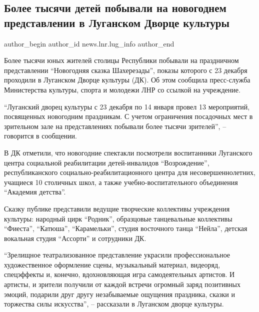  
 
 
 
 
\subsection{Более тысячи детей побывали на новогоднем представлении в Луганском Дворце культуры}
\label{sec:14_01_2022.stz.news.lnr.lug_info.1.deti_novgod_dvorec_kultury}

\ifcmt
 author_begin
   author_id news.lnr.lug_info
 author_end
\fi

Более тысячи юных жителей столицы Республики побывали на праздничном
представлении \enquote{Новогодняя сказка Шахерезады}, показы которого с 23 декабря
проходили в Луганском Дворце культуры (ДК). Об этом сообщила пресс-служба
Министерства культуры, спорта и молодежи ЛНР со ссылкой на учреждение.


\enquote{Луганский дворец культуры с 23 декабря по 14 января провел 13 мероприятий,
посвященных новогодним праздникам. С учетом ограничения посадочных мест в
зрительном зале на представлениях побывали более тысячи зрителей}, – говорится
в сообщении.


В ДК отметили, что новогодние спектакли посмотрели воспитанники Луганского
центра социальной реабилитации детей-инвалидов \enquote{Возрождение}, республиканского
социально-реабилитационного центра для несовершеннолетних, учащиеся 10
столичных школ, а также учебно-воспитательного объединения \enquote{Академия детства}.


Сказку публике представили ведущие творческие коллективы учреждения культуры:
народный цирк \enquote{Родник}, образцовые танцевальные коллективы \enquote{Фиеста}, \enquote{Катюша},
\enquote{Карамельки}, студия восточного танца \enquote{Нейла}, детская вокальная студия
\enquote{Ассорти} и сотрудники ДК.

\enquote{Зрелищное театрализованное представление украсили профессиональное
художественное оформление сцены, музыкальный материал, видеоряд, спецэффекты и,
конечно, вдохновляющая игра самодеятельных артистов. И артисты, и зрители
получили от каждой встречи огромный заряд позитивных эмоций, подарили друг
другу незабываемые ощущения праздника, сказки и торжества силы искусства}, –
рассказали в Луганском дворце культуры.
